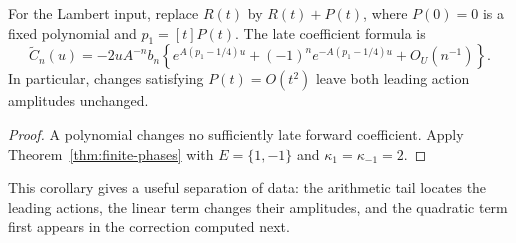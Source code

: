 \begin{corollary}
\label{cor:prefix}
For the Lambert input, replace $R(t)$ by $R(t)+P(t)$, where $P(0)=0$ is a
fixed polynomial and $p_1=[t]P(t)$. The late coefficient formula is
\begin{equation}\label{eq:prefix}
 \widetilde C_n(u)=-2uA^{-n}b_n
 \left\{e^{A(p_1-1/4)u}+(-1)^n e^{-A(p_1-1/4)u}
                     +O_U(n^{-1})\right\}.
\end{equation}
In particular, changes satisfying $P(t)=O(t^2)$ leave both leading action
amplitudes unchanged.
\end{corollary}
\begin{proof}
A polynomial changes no sufficiently late forward coefficient. Apply
Theorem~\ref{thm:finite-phases} with $E=\{1,-1\}$ and
$\kappa_1=\kappa_{-1}=2$.
\end{proof}

This corollary gives a useful separation of data: the arithmetic tail
locates the leading actions, the linear term changes their amplitudes,
and the quadratic term first appears in the correction computed next.
